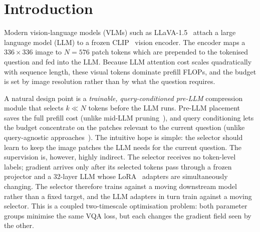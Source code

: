 \documentclass[runningheads]{llncs}
\begin{document}
\section{Introduction}
\label{sec:intro}

Modern vision-language models (VLMs) such as
LLaVA-1.5~\cite{liu2024llava} attach a large language model (LLM) to a
frozen CLIP~\cite{radford2021clip} vision encoder. The encoder maps a
$336{\times}336$ image to $N{=}576$ patch tokens which are prepended to
the tokenised question and fed into the LLM. Because LLM attention cost
scales quadratically with sequence length, these visual tokens dominate
prefill FLOPs, and the budget is set by image resolution rather than by
what the question requires.

A natural design point is a \emph{trainable, query-conditioned pre-LLM}
compression module that selects $k\!\ll\!N$ tokens before the LLM runs.
Pre-LLM placement saves the full prefill cost (unlike mid-LLM
pruning~\cite{chen2024fastv,zhang2025sparsevlm}), and query conditioning
lets the budget concentrate on the patches relevant to the current
question (unlike query-agnostic approaches~\cite{bolya2022token,liang2022evit,shang2024llava}).
The intuitive hope is simple: the selector should learn to keep the
image patches the LLM needs for the current question. The supervision
is, however, highly indirect. The selector receives no token-level
labels; gradient arrives only after its selected tokens pass through a
frozen projector and a 32-layer LLM whose LoRA~\cite{hu2022lora} adapters are
simultaneously changing. The selector therefore trains against a
moving downstream model rather than a fixed target, and the LLM
adapters in turn train against a moving selector. This is a coupled
two-timescale optimisation problem: both parameter groups minimise the
same VQA loss, but each changes the gradient field seen by the other.
\end{document}
